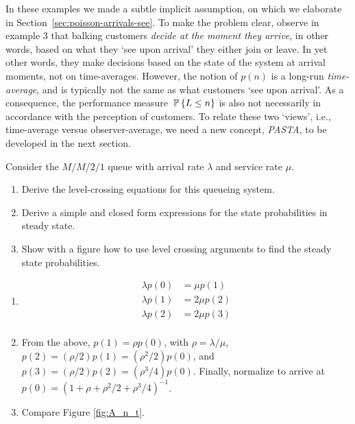 In these examples we made a subtle implicit assumption, on which we
elaborate in Section~\ref{sec:poisson-arrivals-see}. To make the
problem clear, observe in example 3 that balking customers
\emph{decide at the moment they arrive}, in other words, based on what
they `see upon arrival' they either join or leave. In yet other words,
they make decisions based on the state of the system at arrival
moments, not on time-averages. However, the notion of $p(n)$ is a
long-run \emph{time-average}, and is typically not the same as what
customers `see upon arrival'. As a consequence, the performance
measure $\P{L\leq n}$ is also not necessarily in accordance with the
perception of customers. To relate these two `views', i.e.,
time-average versus observer-average, we need a new concept,
\emph{PASTA}, to be developed in the next section. 

\begin{question}
Consider the $M/M/2/1$ queue with arrival rate $\lambda$ and
service rate $\mu$. 
\begin{enumerate}
\item Derive the level-crossing equations for this queueing system. 
\item 
Derive a simple and closed form expressions for the state 
   probabilities in steady state. 
 \item Show with a figure how to use level crossing arguments to find the steady state probabilities.
 \end{enumerate}
 

  \begin{solution}
    \begin{enumerate}
    \item 
    \begin{align*}
   \lambda p(0) &= \mu p(1) \\
   \lambda p(1)  &= 2\mu p(2) \\
   \lambda p(2)  &= 2\mu p(3)\\
    \end{align*}

  \item From the above, $p(1) = \rho p(0)$, with $\rho = \lambda/\mu$,
    $p(2) = (\rho/2) p(1) = (\rho^2/2) p(0)$, and
    $p(3) = (\rho/2) p(2) = (\rho^3/4) p(0)$. Finally, normalize to
    arrive at $p(0) = (1+\rho + \rho^2/2 + \rho^3/4)^{-1}$.
 \item      Compare Figure \ref{fig:A_n_t}.
\end{enumerate}
   \end{solution}
\end{question}


